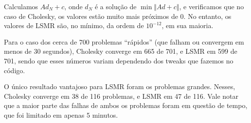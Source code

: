 \documentclass{article}
\newcommand{\norma}[1]{\Vert{#1}\Vert}
\begin{document}
Calculamos $Ad_N+c$, onde $d_N$ é a solução de $\min \norma{Ad+c}$, e
verificamos que no caso de Cholesky, os valores estão muito mais próximos de 0.
No entanto, os valores de LSMR são, no mínimo, da ordem de $10^{-12}$, em sua
maioria.

Para o caso dos cerca de 700 problemas ``rápidos'' (que falham ou convergem em
menos de 30 segundos), Cholesky converge em 665 de 701, e LSMR em 599 de 701,
sendo que esses números variam dependendo dos tweaks que fazemos no código.

O único resultado vantajoso para LSMR foram os problemas grandes. Nesses,
Cholesky converge em 38 de 116 problemas, e LSMR em 47 de 116. Vale notar que a
maior parte das falhas de ambos os problemas foram em questão de tempo, que foi
limitado em apenas 5 minutos.
\end{document}
